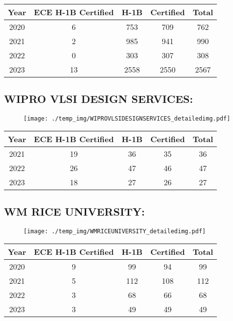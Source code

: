 \documentclass{article}%
\begin{document}
%
\begin{longtable}{c|c|c|c|c}%
\hline%
Year&ECE H{-}1B Certified&H{-}1B&Certified&Total\\%
\hline%
2020&6&753&709&762\\%
\hline%
2021&2&985&941&990\\%
\hline%
2022&0&303&307&308\\%
\hline%
2023&13&2558&2550&2567\\%
\hline%
\end{longtable}

%
\newpage%
\subsection{WIPRO VLSI DESIGN SERVICES:}%
\label{subsec:WIPROVLSIDESIGNSERVICES}%
\label{WIPROVLSIDESIGNSERVICESdetailed}%


\begin{figure}[htbp]%
\centering%
\texttt{[image: ./temp\_img/WIPROVLSIDESIGNSERVICES\_detailedimg.pdf]}%
\end{figure}

%
\begin{longtable}{c|c|c|c|c}%
\hline%
Year&ECE H{-}1B Certified&H{-}1B&Certified&Total\\%
\hline%
2021&19&36&35&36\\%
\hline%
2022&26&47&46&47\\%
\hline%
2023&18&27&26&27\\%
\hline%
\end{longtable}

%
\newpage%
\subsection{WM RICE UNIVERSITY:}%
\label{subsec:WMRICEUNIVERSITY}%
\label{WMRICEUNIVERSITYdetailed}%


\begin{figure}[htbp]%
\centering%
\texttt{[image: ./temp\_img/WMRICEUNIVERSITY\_detailedimg.pdf]}%
\end{figure}

%
\begin{longtable}{c|c|c|c|c}%
\hline%
Year&ECE H{-}1B Certified&H{-}1B&Certified&Total\\%
\hline%
2020&9&99&94&99\\%
\hline%
2021&5&112&108&112\\%
\hline%
2022&3&68&66&68\\%
\hline%
2023&3&49&49&49\\%
\hline%
\end{longtable}
\end{document}
